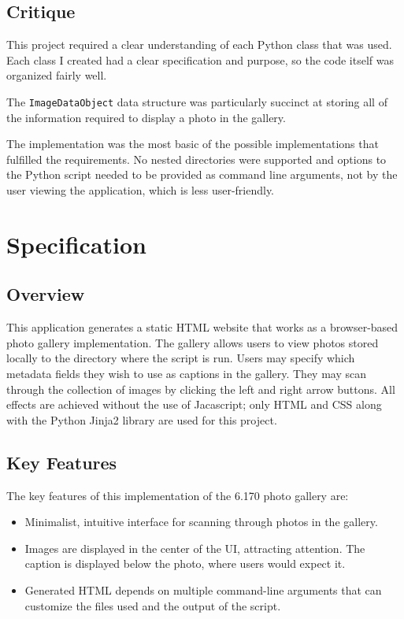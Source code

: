 \documentclass[11pt,letterpaper]{article}
\begin{document}
\subsection{Critique}
This project required a clear understanding of each Python class that was used. Each class I created had a clear specification and purpose, so the code itself was organized fairly well.

The \texttt{ImageDataObject} data structure was particularly succinct at storing all of the information required to display a photo in the gallery.

The implementation was the most basic of the possible implementations that fulfilled the requirements. No nested directories were supported and options to the Python script needed to be provided as command line arguments, not by the user viewing the application, which is less user-friendly.
\section{Specification}
\subsection{Overview}
This application generates a static HTML website that works as a browser-based photo gallery implementation. The gallery allows users to view photos stored locally to the directory where the script is run. Users may specify which metadata fields they wish to use as captions in the gallery. They may scan through the collection of images by clicking the left and right arrow buttons. All effects are achieved without the use of Jacascript; only HTML and CSS along with the Python Jinja2 library are used for this project.
\subsection{Key Features}
The key features of this implementation of the 6.170 photo gallery are:
\begin{itemize}
\item Minimalist, intuitive interface for scanning through photos in the gallery.
\item Images are displayed in the center of the UI, attracting attention. The caption is displayed below the photo, where users would expect it.
\item Generated HTML depends on multiple command-line arguments that can customize the files used and the output of the script.
\end{itemize}
\end{document}
